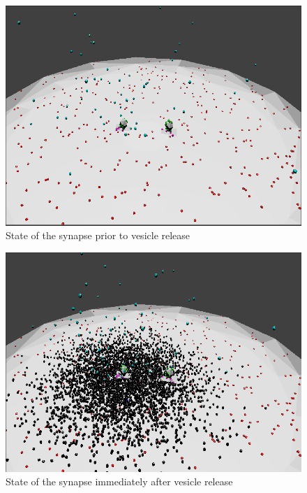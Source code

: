\documentclass[a4paper]{article}
\begin{document}
\begin{figure}[H]
   \centering
   \includegraphics[scale = 0.4]{fig1.png} %
   \caption{State of the synapse prior to vesicle release}
   \label{fig1}
\end{figure}
\begin{figure}[H]
   \centering
   \includegraphics[scale = 0.4]{fig2.png} %
   \caption{State of the synapse immediately after vesicle release}
   \label{fig2}
\end{figure}
\end{document}
